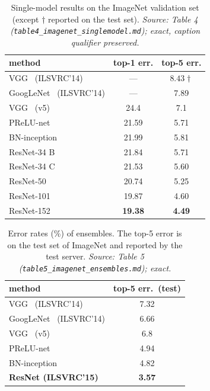 \begin{table}[t]
\centering
\caption{Single-model results on the ImageNet validation set
(except $\dagger$ reported on the test set). \emph{Source: Table 4
(\texttt{table4\_imagenet\_singlemodel.md}); exact, caption qualifier preserved.}}
\label{tab:singlemodel}
\small
\begin{tabular}{l c c}
\toprule
method & top-1 err. & top-5 err. \\
\midrule
VGG~\cite{vgg2015} (ILSVRC'14)       & ---   & $8.43\dagger$ \\
GoogLeNet~\cite{googlenet2015} (ILSVRC'14) & --- & 7.89 \\
VGG~\cite{vgg2015} (v5)              & 24.4  & 7.1  \\
PReLU-net~\cite{msra2015}           & 21.59 & 5.71 \\
BN-inception~\cite{bn2015}          & 21.99 & 5.81 \\
ResNet-34 B                          & 21.84 & 5.71 \\
ResNet-34 C                          & 21.53 & 5.60 \\
ResNet-50                            & 20.74 & 5.25 \\
ResNet-101                           & 19.87 & 4.60 \\
ResNet-152                           & \textbf{19.38} & \textbf{4.49} \\
\bottomrule
\end{tabular}
\end{table}

\begin{table}[t]
\centering
\caption{Error rates (\%) of ensembles. The top-5 error is on the test set of
ImageNet and reported by the test server. \emph{Source: Table 5
(\texttt{table5\_imagenet\_ensembles.md}); exact.}}
\label{tab:ensemble}
\small
\begin{tabular}{l c}
\toprule
method & top-5 err.\ (test) \\
\midrule
VGG~\cite{vgg2015} (ILSVRC'14)      & 7.32 \\
GoogLeNet~\cite{googlenet2015} (ILSVRC'14) & 6.66 \\
VGG~\cite{vgg2015} (v5)             & 6.8  \\
PReLU-net~\cite{msra2015}          & 4.94 \\
BN-inception~\cite{bn2015}         & 4.82 \\
\textbf{ResNet (ILSVRC'15)}         & \textbf{3.57} \\
\bottomrule
\end{tabular}
\end{table}

